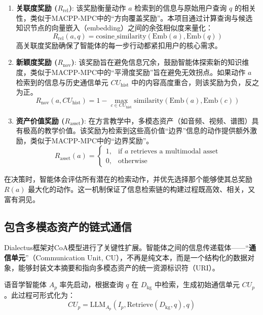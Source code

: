 \begin{enumerate}
    \item \textbf{关联度奖励 ($R_{\text{rel}}$)}: 该奖励衡量动作 $a$ 检索到的信息与原始用户查询 $q$ 的相关性，类似于MACPP-MPC中的“方向覆盖奖励”。本项目通过计算查询与候选知识节点的向量嵌入（embedding）之间的余弦相似度来量化：
    \begin{equation}
    R_{\text{rel}}(a, q) = \text{cosine\_similarity}(\text{Emb}(a), \text{Emb}(q))
    \end{equation}
    高关联度奖励确保了智能体的每一步行动都紧扣用户的核心需求。

    \item \textbf{新颖度奖励 ($R_{\text{nov}}$)}: 该奖励旨在避免信息冗余，鼓励智能体探索新的知识维度，类似于MACPP-MPC中的“平滑度奖励”旨在避免无效拐点。如果动作 $a$ 检索到的信息与历史通信单元 $CU_{\text{hist}}$ 中的内容高度重合，则该奖励为负，反之为正。
    \begin{equation}
    R_{\text{nov}}(a, CU_{\text{hist}}) = 1 - \max_{c \in CU_{\text{hist}}} \text{similarity}(\text{Emb}(a), \text{Emb}(c))
    \end{equation}

    \item \textbf{资产价值奖励 ($R_{\text{asset}}$)}: 在方言教学中，多模态资产（如音频、视频、谱图）具有极高的教学价值。该奖励为检索到这些高价值“边界”信息的动作提供额外激励，类似于MACPP-MPC中的“边界奖励”。
    \begin{equation}
    R_{\text{asset}}(a) = 
    \begin{cases} 
    1, & \text{if } a \text{ retrieves a multimodal asset} \\
    0, & \text{otherwise}
    \end{cases}
    \end{equation}
\end{enumerate}
在决策时，智能体会评估所有潜在的检索动作，并优先选择那个能够使其总奖励 $R(a)$ 最大化的动作。这一机制保证了信息检索链的构建过程既高效、相关，又富有洞见。

\subsection{包含多模态资产的链式通信}
Dialectus框架对CoA模型进行了关键性扩展。智能体之间的信息传递载体——“\textbf{通信单元}”（Communication Unit, CU），不再是纯文本，而是一个结构化的数据对象，能够封装文本摘要和指向多模态资产的统一资源标识符（URI）。

语音学智能体 $A_p$ 率先启动，根据查询 $q$ 在 $D_{\text{kg}}$ 中检索，生成初始通信单元 $CU_p$。此过程可形式化为：
\begin{equation}
    CU_p = \text{LLM}_{A_p} (I_p, \text{Retrieve}(D_{\text{kg}}, q), q)
    \label{eq:cu_p}
\end{equation}

